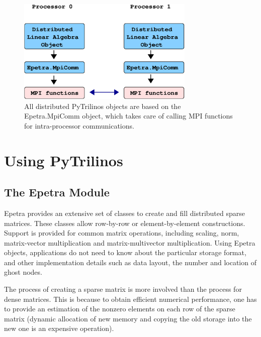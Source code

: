 \documentclass[10pt,relax]{SANDreport}
\begin{document}
\begin{figure}
\begin{center}
\includegraphics[height=5cm]{../UsersGuide/distributed_object.eps}
\caption{All distributed PyTrilinos objects are based on the Epetra.MpiComm
  object, which takes care of calling MPI functions for intra-processor
    communications.}
\label{fig:distributed}
\end{center}
\end{figure}

\section{Using PyTrilinos}
\label{sec:using}

\subsection{The Epetra Module}
\label{subsec:epetra}

Epetra provides an extensive set of classes to create and fill
distributed sparse matrices. These classes allow row-by-row or
element-by-element constructions. Support is provided for common
matrix operations, including scaling, norm, matrix-vector
multiplication and matrix-multivector multiplication.  Using Epetra
objects, applications do not need to know about the particular storage
format, and other implementation details such as data layout, the
number and location of ghost nodes.

The process of creating a sparse matrix is more involved than the
process for dense matrices. This is because to obtain efficient
numerical performance, one has to provide an estimation of the nonzero
elements on each row of the sparse matrix (dynamic allocation of new
memory and copying the old storage into the new one is an expensive
operation).
\end{document}
